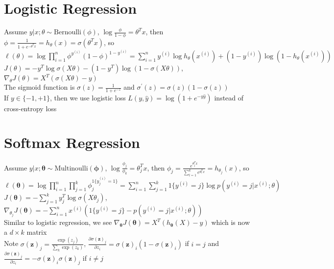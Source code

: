 \documentclass{article}
\begin{document}
\section{Logistic Regression}
Assume $y|x ; \theta \sim \mbox{Bernoulli}(\phi)$, $\log \frac{\phi}{1-\phi} = \theta^T x$, then $\phi = \frac{1}{1+e^{-\theta^T x}} = h_\theta(x) = \sigma(\theta^Tx) $, so \\
$\ell(\theta) = \log\prod\limits_{i=1}^n \phi^{y^{(i)}}(1-\phi)^{1-y^{(i)}} = \sum\limits_{i=1}^n  y^{(i)}\log h_\theta(x^{(i)}) + (1-y^{(i)})\log (1-h_\theta(x^{(i)}))$ \\
$J(\theta) = - y^T \log \sigma(X\theta) - (1-y^T)\log (1-\sigma(X\theta))$, $\nabla_\theta J(\theta) = X^T (\sigma(X\theta) - y)$ \\
The sigmoid function is $\sigma(z) = \frac{1}{1+e^{-z}}$ and $\sigma^\prime(z) = \sigma(z)(1-\sigma(z))$ \\
If $y \in \{-1, +1\}$, then we use logistic loss $L(y, \hat y) =\log (1 + e^{-y\hat y})$ instead of cross-entropy loss

\section{Softmax Regression}
Assume $y|x ; \boldsymbol \theta \sim \mbox{Multinoulli}(\boldsymbol \phi)$, $\log\frac{\phi_j}{\phi_k} = \theta_j^Tx$, then $\phi_j = \frac{e^{\theta_j^Tx}}{\sum_{l=1}^k e^{\theta_l^Tx}} = h_{\theta_j}(x)$, so \\
$\ell(\boldsymbol \theta) = \log \prod\limits_{i=1}^n \prod\limits_{j=1}^k \phi_j^{1\{y^{(i)}_j = 1\}} = \sum\limits_{i=1}^n \sum\limits_{j=1}^k 1\{y^{(i)} = j \}\log p(y^{(i)} = j | x^{(i)}; \theta)$ \\
$J(\boldsymbol \theta) = -\sum\limits_{j=1}^k y_j^T \log \sigma(X\theta_j)$, $\nabla_{\theta_j} J(\boldsymbol \theta) = - \sum\limits_{i=1}^n x^{(i)}({1\{y^{(i)} = j\}} - p(y^{(i)} = j | x^{(i)}; \theta))$ \\
Similar to logistic regression, we see $\nabla_{\boldsymbol \theta} J(\boldsymbol \theta) = X^T(h_{\boldsymbol \theta}(X) - y)$ which is now a $d \times k$ matrix \\
Note $\sigma(\boldsymbol z)_j = \frac{\exp(z_j)}{\sum_k \exp(z_k)}$, $\frac{\partial \sigma (\boldsymbol z)_j}{\partial z_i} = \sigma (\boldsymbol z)_i ( 1- \sigma (\boldsymbol z)_i)$ if $i = j$ and $\frac{\partial \sigma (\boldsymbol z)_j}{\partial z_i} = -\sigma (\boldsymbol z)_i\sigma (\boldsymbol z)_j$ if $i \neq j$
\end{document}
